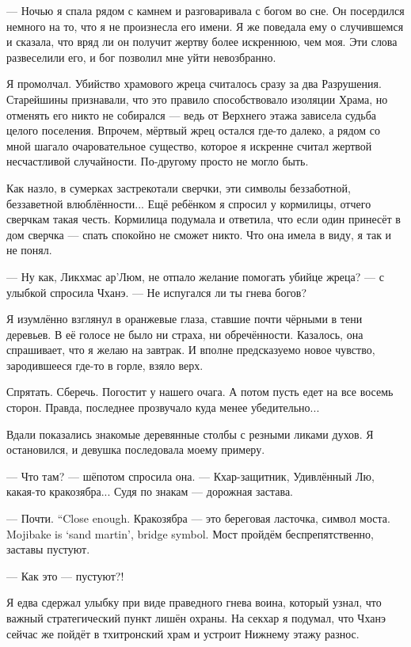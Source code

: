 --- Ночью я спала рядом с камнем и разговаривала с богом во сне.
Он посердился немного на то, что я не произнесла его имени.
Я же поведала ему о случившемся и сказала, что вряд ли он получит жертву более искреннюю, чем моя.
Эти слова развеселили его, и бог позволил мне уйти невозбранно.

Я промолчал.
Убийство храмового жреца считалось сразу за два Разрушения.
Старейшины признавали, что это правило способствовало изоляции Храма, но отменять его никто не собирался --- ведь от Верхнего этажа зависела судьба целого поселения.
Впрочем, мёртвый жрец остался где-то далеко, а рядом со мной шагало очаровательное существо, которое я искренне считал жертвой несчастливой случайности.
По-другому просто не могло быть.

Как назло, в сумерках застрекотали сверчки, эти символы беззаботной, беззаветной влюблённости...
Ещё ребёнком я спросил у кормилицы, отчего сверчкам такая честь.
Кормилица подумала и ответила, что если один принесёт в дом сверчка --- спать спокойно не сможет никто.
Что она имела в виду, я так и не понял.

--- Ну как, Ликхмас ар’Люм, не отпало желание помогать убийце жреца? --- с улыбкой спросила Чханэ.
--- Не испугался ли ты гнева богов?

Я изумлённо взглянул в оранжевые глаза, ставшие почти чёрными в тени деревьев.
В её голосе не было ни страха, ни обречённости.
Казалось, она спрашивает, что я желаю на завтрак.
И вполне предсказуемо новое чувство, зародившееся где-то в горле, взяло верх.

Спрятать.
Сберечь.
Погостит у нашего очага.
А потом пусть едет на все восемь сторон.
Правда, последнее прозвучало куда менее убедительно...

Вдали показались знакомые деревянные столбы с резными ликами духов.
Я остановился, и девушка последовала моему примеру.

--- Что там? --- шёпотом спросила она.
--- Кхар-защитник, Удивлённый Лю, какая-то кракозябра...
Судя по знакам --- дорожная застава.

{--- Почти.}
{``Close enough.}
{Кракозябра --- это береговая ласточка, символ моста.}
{Mojibake is `sand martin', bridge symbol.}
Мост пройдём беспрепятственно, заставы пустуют.

--- Как это --- пустуют?!

Я едва сдержал улыбку при виде праведного гнева воина, который узнал, что важный стратегический пункт лишён охраны.
На секхар я подумал, что Чханэ сейчас же пойдёт в тхитронский храм и устроит Нижнему этажу разнос.

